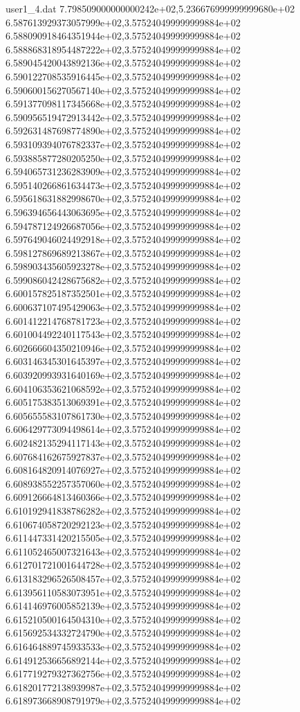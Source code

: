 \begin{filecontents}{user1_4.dat}
7.798509000000000242e+02,5.236676999999999680e+02
6.587613929373057999e+02,3.575240499999999884e+02
6.588090918464351944e+02,3.575240499999999884e+02
6.588868318954487222e+02,3.575240499999999884e+02
6.589045420043892136e+02,3.575240499999999884e+02
6.590122708535916445e+02,3.575240499999999884e+02
6.590600156270567140e+02,3.575240499999999884e+02
6.591377098117345668e+02,3.575240499999999884e+02
6.590956519472913442e+02,3.575240499999999884e+02
6.592631487698774890e+02,3.575240499999999884e+02
6.593109394076782337e+02,3.575240499999999884e+02
6.593885877280205250e+02,3.575240499999999884e+02
6.594065731236283909e+02,3.575240499999999884e+02
6.595140266861634473e+02,3.575240499999999884e+02
6.595618631882998670e+02,3.575240499999999884e+02
6.596394656443063695e+02,3.575240499999999884e+02
6.594787124926687056e+02,3.575240499999999884e+02
6.597649046024492918e+02,3.575240499999999884e+02
6.598127869689213867e+02,3.575240499999999884e+02
6.598903435605923278e+02,3.575240499999999884e+02
6.599086042428675682e+02,3.575240499999999884e+02
6.600157825187352501e+02,3.575240499999999884e+02
6.600637107495429063e+02,3.575240499999999884e+02
6.601412214768781723e+02,3.575240499999999884e+02
6.601004492240117543e+02,3.575240499999999884e+02
6.602666604350210946e+02,3.575240499999999884e+02
6.603146345301645397e+02,3.575240499999999884e+02
6.603920993931640169e+02,3.575240499999999884e+02
6.604106353621068592e+02,3.575240499999999884e+02
6.605175383513069391e+02,3.575240499999999884e+02
6.605655583107861730e+02,3.575240499999999884e+02
6.606429773094498614e+02,3.575240499999999884e+02
6.602482135294117143e+02,3.575240499999999884e+02
6.607684162675927837e+02,3.575240499999999884e+02
6.608164820914076927e+02,3.575240499999999884e+02
6.608938552257357060e+02,3.575240499999999884e+02
6.609126664813460366e+02,3.575240499999999884e+02
6.610192941838786282e+02,3.575240499999999884e+02
6.610674058720292123e+02,3.575240499999999884e+02
6.611447331420215505e+02,3.575240499999999884e+02
6.611052465007321643e+02,3.575240499999999884e+02
6.612701721001644728e+02,3.575240499999999884e+02
6.613183296526508457e+02,3.575240499999999884e+02
6.613956110583073951e+02,3.575240499999999884e+02
6.614146976005852139e+02,3.575240499999999884e+02
6.615210500164504310e+02,3.575240499999999884e+02
6.615692534332724790e+02,3.575240499999999884e+02
6.616464889745933533e+02,3.575240499999999884e+02
6.614912536656892144e+02,3.575240499999999884e+02
6.617719279327362756e+02,3.575240499999999884e+02
6.618201772138939987e+02,3.575240499999999884e+02
6.618973668908791979e+02,3.575240499999999884e+02

\end{filecontents}
